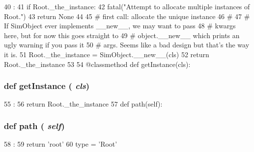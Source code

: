 \begin{DoxyCode}
40                               :
41         if Root._the_instance:
42             fatal("Attempt to allocate multiple instances of Root.")
43             return None
44 
45         # first call: allocate the unique instance
46         #
47         # If SimObject ever implements __new__, we may want to pass
48         # kwargs here, but for now this goes straight to
49         # object.__new__ which prints an ugly warning if you pass it
50         # args.  Seems like a bad design but that's the way it is.
51         Root._the_instance = SimObject.__new__(cls)
52         return Root._the_instance
53         
54     @classmethod
    def getInstance(cls):
\end{DoxyCode}
\hypertarget{classRoot_1_1Root_a6ca8e60d546903376be2d1eca9b90a7f}{
\subsubsection[{getInstance}]{\setlength{\rightskip}{0pt plus 5cm}def getInstance ( {\em cls})}}
\label{classRoot_1_1Root_a6ca8e60d546903376be2d1eca9b90a7f}



\begin{DoxyCode}
55                         :
56         return Root._the_instance
57 
    def path(self):
\end{DoxyCode}
\hypertarget{classRoot_1_1Root_a4767b0796ffc0da267b28b3f24776d97}{
\subsubsection[{path}]{\setlength{\rightskip}{0pt plus 5cm}def path ( {\em self})}}
\label{classRoot_1_1Root_a4767b0796ffc0da267b28b3f24776d97}



\begin{DoxyCode}
58                   :
59         return 'root'
60 
    type = 'Root'
\end{DoxyCode}


